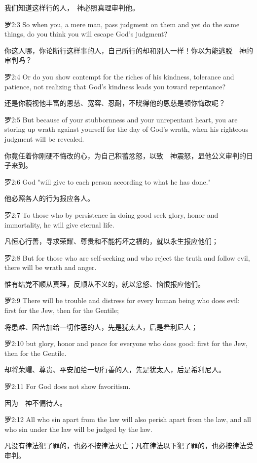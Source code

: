 \documentclass[a4paper,11pt,onecolumn,twoside]{ctexart}
\begin{document}
\begin{multicols}{2}
 我们知道这样行的人，　神必照真理审判他。


 罗2:3
 So when you, a mere man, pass judgment on them and yet do the same things, do you think you will escape God's judgment?

 你这人哪，你论断行这样事的人，自己所行的却和别人一样！你以为能逃脱　神的审判吗？


 罗2:4
 Or do you show contempt for the riches of his kindness, tolerance and patience, not realizing that God's kindness leads you toward repentance?

 还是你藐视他丰富的恩慈、宽容、忍耐，不晓得他的恩慈是领你悔改呢？


 罗2:5
 But because of your stubbornness and your unrepentant heart, you are storing up wrath against yourself for the day of God's wrath, when his righteous judgment will be revealed.

 你竟任着你刚硬不悔改的心，为自己积蓄忿怒，以致　神震怒，显他公义审判的日子来到。


 罗2:6
 God "will give to each person according to what he has done."

 他必照各人的行为报应各人。


 罗2:7
 To those who by persistence in doing good seek glory, honor and immortality, he will give eternal life.

 凡恒心行善，寻求荣耀、尊贵和不能朽坏之福的，就以永生报应他们；


 罗2:8
 But for those who are self-seeking and who reject the truth and follow evil, there will be wrath and anger.

 惟有结党不顺从真理，反顺从不义的，就以忿怒、恼恨报应他们。


 罗2:9
 There will be trouble and distress for every human being who does evil: first for the Jew, then for the Gentile;

 将患难、困苦加给一切作恶的人，先是犹太人，后是希利尼人；


 罗2:10
 but glory, honor and peace for everyone who does good: first for the Jew, then for the Gentile.

 却将荣耀、尊贵、平安加给一切行善的人，先是犹太人，后是希利尼人。


 罗2:11
 For God does not show favoritism.

 因为　神不偏待人。


 罗2:12
 All who sin apart from the law will also perish apart from the law, and all who sin under the law will be judged by the law.

 凡没有律法犯了罪的，也必不按律法灭亡；凡在律法以下犯了罪的，也必按律法受审判。



\end{multicols}
\end{document}
